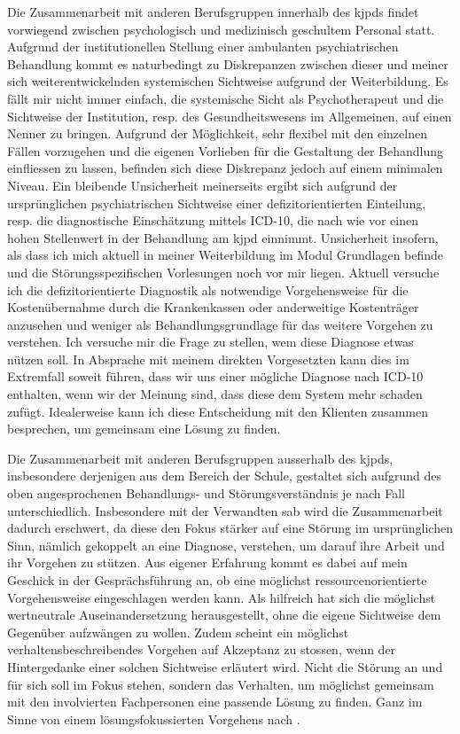 Die Zusammenarbeit mit anderen Berufsgruppen innerhalb des \ac{kjpd}s findet vorwiegend zwischen psychologisch und medizinisch geschultem Personal statt. Aufgrund der institutionellen Stellung einer ambulanten psychiatrischen Behandlung kommt es naturbedingt zu Diskrepanzen zwischen dieser und meiner sich weiterentwickelnden systemischen Sichtweise aufgrund der Weiterbildung. Es fällt mir nicht immer einfach, die systemische Sicht als Psychotherapeut und die Sichtweise der Institution, resp. des Gesundheitswesens im Allgemeinen, auf einen Nenner zu bringen. Aufgrund der Möglichkeit, sehr flexibel mit den einzelnen Fällen vorzugehen und die eigenen Vorlieben für die Gestaltung der Behandlung einfliessen zu lassen, befinden sich diese Diskrepanz jedoch auf einem minimalen Niveau. Ein bleibende  Unsicherheit meinerseits ergibt sich aufgrund der ursprünglichen psychiatrischen Sichtweise einer defizitorientierten Einteilung, resp. die diagnostische Einschätzung mittels  ICD-10, die nach wie vor einen hohen Stellenwert in der Behandlung am \ac{kjpd} einnimmt. Unsicherheit insofern, als dass ich mich aktuell in meiner Weiterbildung im Modul Grundlagen befinde und die Störungsspezifischen Vorlesungen noch vor mir liegen. Aktuell versuche ich die defizitorientierte Diagnostik als notwendige Vorgehensweise für die Kostenübernahme durch die Krankenkassen oder anderweitige Kostenträger anzusehen und weniger als Behandlungsgrundlage für das weitere Vorgehen zu verstehen. Ich versuche mir die Frage zu stellen, wem diese Diagnose etwas nützen soll. In Absprache mit meinem direkten Vorgesetzten kann dies im Extremfall soweit führen, dass wir uns einer mögliche Diagnose nach ICD-10 enthalten, wenn wir der Meinung sind, dass diese dem System mehr schaden zufügt. Idealerweise kann ich diese Entscheidung mit den Klienten zusammen besprechen, um gemeinsam eine Lösung zu finden. 

Die Zusammenarbeit mit anderen Berufsgruppen ausserhalb des \ac{kjpd}s, insbesondere derjenigen aus dem Bereich der Schule, gestaltet sich aufgrund des oben angesprochenen Behandlungs- und Störungsverständnis je nach Fall unterschiedlich. Insbesondere mit der Verwandten \ac{sab} wird die Zusammenarbeit dadurch erschwert, da diese den Fokus stärker auf eine Störung im ursprünglichen Sinn, nämlich gekoppelt an eine Diagnose, verstehen, um darauf ihre Arbeit und ihr Vorgehen zu stützen. Aus eigener Erfahrung kommt es dabei auf mein Geschick in der Gesprächsführung an, ob eine möglichst ressourcenorientierte Vorgehensweise eingeschlagen werden kann. Als hilfreich hat sich die möglichst wertneutrale Auseinandersetzung herausgestellt, ohne die eigene Sichtweise dem Gegenüber aufzwängen zu wollen. Zudem scheint ein möglichst verhaltensbeschreibendes Vorgehen auf Akzeptanz zu stossen, wenn der Hintergedanke einer solchen Sichtweise erläutert wird. Nicht die Störung an und für sich soll im Fokus stehen, sondern das Verhalten, um möglichst gemeinsam mit den involvierten Fachpersonen eine passende Lösung zu finden. Ganz im Sinne von einem lösungsfokussierten Vorgehens nach . 
 
